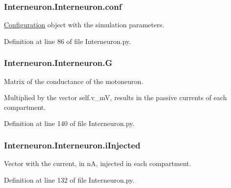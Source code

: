 \subsubsection[{\texorpdfstring{conf}{conf}}]{\setlength{\rightskip}{0pt plus 5cm}Interneuron.\+Interneuron.\+conf}\hypertarget{class_interneuron_1_1_interneuron_a20078e4de62213b832ce7f1cf2c587c7}{}\label{class_interneuron_1_1_interneuron_a20078e4de62213b832ce7f1cf2c587c7}


\hyperlink{namespace_configuration}{Configuration} object with the simulation parameters. 



Definition at line 86 of file Interneuron.\+py.

\subsubsection[{\texorpdfstring{G}{G}}]{\setlength{\rightskip}{0pt plus 5cm}Interneuron.\+Interneuron.\+G}\hypertarget{class_interneuron_1_1_interneuron_a1c2c1b2f13cd69c09923e684a0b54171}{}\label{class_interneuron_1_1_interneuron_a1c2c1b2f13cd69c09923e684a0b54171}


Matrix of the conductance of the motoneuron. 

Multiplied by the vector self.\+v\+\_\+mV, results in the passive currents of each compartment. 

Definition at line 140 of file Interneuron.\+py.

\subsubsection[{\texorpdfstring{i\+Injected}{iInjected}}]{\setlength{\rightskip}{0pt plus 5cm}Interneuron.\+Interneuron.\+i\+Injected}\hypertarget{class_interneuron_1_1_interneuron_ab9a0874ea1e099b07a66ed9eaf3ff14b}{}\label{class_interneuron_1_1_interneuron_ab9a0874ea1e099b07a66ed9eaf3ff14b}


Vector with the current, in nA, injected in each compartment. 



Definition at line 132 of file Interneuron.\+py.

